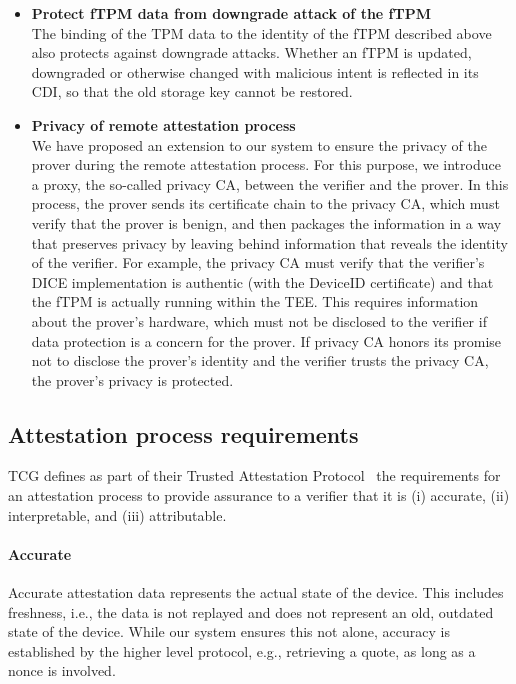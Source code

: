 \begin{itemize}
    \item{\textbf{Protect fTPM data from downgrade attack of the fTPM}\\
    The binding of the TPM data to the identity of the fTPM described above also protects against downgrade attacks.
    Whether an fTPM is updated, downgraded or otherwise changed with malicious intent is reflected in its CDI, so that the old storage key cannot be restored.
    }

    \item{\textbf{Privacy of remote attestation process}\\
    We have proposed an extension to our system to ensure the privacy of the prover during the remote attestation process.
    For this purpose, we introduce a proxy, the so-called privacy CA, between the verifier and the prover.
    In this process, the prover sends its certificate chain to the privacy CA, which must verify that the prover is benign, and then packages the information in a way that preserves privacy by leaving behind information that reveals the identity of the verifier.
    For example, the privacy CA must verify that the verifier's DICE implementation is authentic (with the DeviceID certificate) and that the fTPM is actually running within the TEE\@.
    This requires information about the prover's hardware, which must not be disclosed to the verifier if data protection is a concern for the prover.
    If privacy CA honors its promise not to disclose the prover's identity and the verifier trusts the privacy CA, the prover's privacy is protected.
    }
\end{itemize}

\subsection{Attestation process requirements}


\ac{TCG} defines as part of their Trusted Attestation Protocol~\cite{tap} the requirements for an attestation process to provide assurance to a verifier that it is (i) accurate, (ii) interpretable, and (iii) attributable.

\paragraph{Accurate}
Accurate attestation data represents the actual state of the device.
This includes freshness, i.e., the data is not replayed and does not represent an old, outdated state of the device.
While our system ensures this not alone, accuracy is established by the higher level protocol, e.g., retrieving a quote, as long as a nonce is involved.


